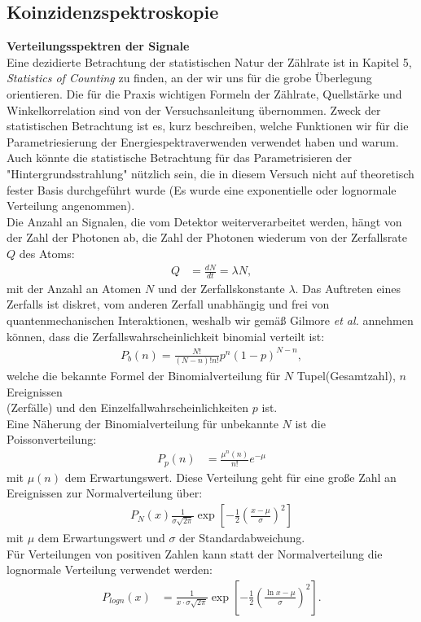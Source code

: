 \documentclass[%
aps,
onecolumn,
11pt,
tightenlines,
nofootinbib,
superscriptaddress,
floatfix,
prd,
]{revtex4-2}
\begin{document}
\subsection{Koinzidenzspektroskopie}
\label{sec:Koinzidenzspektroskopie}
\noindent \textbf{Verteilungsspektren der Signale}\\
Eine dezidierte Betrachtung der statistischen Natur der Zählrate ist in \cite{gilmore2008practical} Kapitel 5, \textit{Statistics of Counting} zu finden, an der wir uns für die grobe Überlegung orientieren. Die für die Praxis wichtigen Formeln der Zählrate, Quellstärke und Winkelkorrelation sind von der Versuchsanleitung \cite{manual1} übernommen. Zweck der statistischen Betrachtung ist es, kurz beschreiben, welche Funktionen wir für die Parametriesierung der Energiespektraverwenden verwendet haben und warum. Auch könnte die statistische Betrachtung für das Parametrisieren der "Hintergrundsstrahlung" nützlich sein, die in diesem Versuch nicht auf theoretisch fester Basis durchgeführt wurde (Es wurde eine exponentielle oder lognormale Verteilung angenommen).\\
Die Anzahl an Signalen, die vom Detektor weiterverarbeitet werden, hängt von der Zahl der Photonen ab, die Zahl der Photonen wiederum von der Zerfallsrate $Q$ des Atoms:
\begin{align}
	Q &= \frac{dN}{dt} = \lambda N, 
\end{align}
mit der Anzahl an Atomen $N$ und der Zerfallskonstante $\lambda$. Das Auftreten eines Zerfalls ist diskret, vom anderen Zerfall unabhängig und frei von quantenmechanischen Interaktionen, weshalb wir gemäß Gilmore \textit{et al.} annehmen können, dass die Zerfallswahrscheinlichkeit binomial verteilt ist:
\begin{align}
	P_b(n) = \frac{N!}{(N - n)!n!}p^n(1-p)^{N-n},
\end{align}
welche die bekannte Formel der Binomialverteilung für $N$ Tupel(Gesamtzahl), $n$ Ereignissen \\(Zerfälle) und den Einzelfallwahrscheinlichkeiten $p$ ist. \\
Eine Näherung der Binomialverteilung für unbekannte $N$ ist die Poissonverteilung:
\begin{align}
	P_p(n) &= \frac{\mu^n(n)}{n!}e^{-\mu}
\end{align}
mit $\mu(n)$ dem Erwartungswert. Diese Verteilung geht für eine große Zahl an Ereignissen zur Normalverteilung über:
\begin{align}
	\label{eq:gaussian}
	P_N(x)\frac{1}{\sigma \sqrt{2\pi}} \exp \left[ -\frac{1}{2} \left( \frac{x-\mu}{\sigma} \right)^2 \right ]
\end{align}
mit $\mu$ dem Erwartungswert und $\sigma$ der Standardabweichung. \\
Für Verteilungen von positiven Zahlen kann statt der Normalverteilung die lognormale Verteilung verwendet werden:
\begin{align}
	\label{eq:lognormal}
	P_{logn}(x) &= \frac{1}{x \cdot \sigma \sqrt{2\pi}} \exp \left[ -\frac{1}{2} \left ( \frac{\ln x - \mu}{\sigma} \right )^2  \right].
\end{align}
\end{document}
